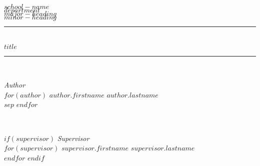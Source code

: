 \documentclass[12pt]{article}
\begin{document}

\begin{titlepage} %
	\newcommand{\HRule}{\rule{\linewidth}{0.5mm}} %
	
	\center %
	
	
	\textsc{\LARGE $school-name$}\\[0.8cm] %

	\textsc{\Large $department$}\\[1.5cm] %
	
	\textsc{\large $major-heading$}\\[0.8cm] %
	
	\textsc{\large $minor-heading$}\\[0.8cm] %
	
	
	\HRule\\[0.4cm]
	
	{\huge\bfseries $title$}\\[0.4cm] %
	
	\HRule\\[1.5cm]
	
	
	\begin{minipage}{0.4\textwidth}
		\begin{flushleft}
			\large
			\textit{Author}\\
            $for(author)$
			$author.firstname$ \textsc{$author.lastname$} \\ $sep$
            $endfor$
		\end{flushleft}
	\end{minipage}
	~
	\begin{minipage}{0.4\textwidth}
		\begin{flushright}
            $if(supervisor)$
			    \large
			    \textit{Supervisor}\\
                $for(supervisor)$
                    $supervisor.firstname$ \textsc{$supervisor.lastname$}\\[0.5cm]
                $endfor$
            $endif$


\end{flushright}
\end{minipage}
\end{titlepage}
\end{document}
